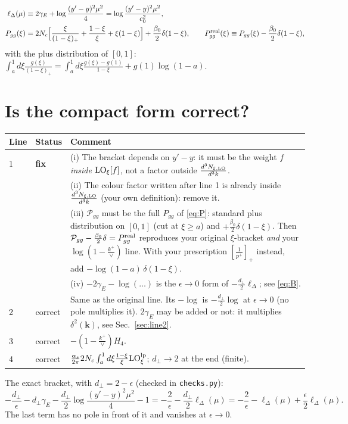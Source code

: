 \documentclass[10pt]{article}
\numberwithin{equation}{section}
\newcommand{\LO}{{\rm LO}}
\begin{document}
\begin{align}
\ell_\Delta(\mu)&\equiv2\gamma_E+\log\frac{(y'-y)^2\mu^2}{4}=\log\frac{(y'-y)^2\mu^2}{c_0^2},\label{eq:ell}\\
P_{gg}(\xi)&=2N_c\Big[\frac{\xi}{(1-\xi)_+}+\frac{1-\xi}{\xi}+\xi(1-\xi)\Big]+\frac{\beta_0}{2}\delta(1-\xi),\qquad
P^{\rm real}_{gg}(\xi)\equiv P_{gg}(\xi)-\frac{\beta_0}{2}\delta(1-\xi),\label{eq:P}
\end{align}
with the plus distribution of $[0,1]$: $\int_a^1d\xi\frac{g(\xi)}{(1-\xi)_+}=\int_a^1d\xi\frac{g(\xi)-g(1)}{1-\xi}+g(1)\log(1-a)$.

\section{Is the compact form correct?}
\begin{center}\small
\begin{tabular}{@{}l l p{}@{}}
\toprule
Line & Status & Comment\\\midrule
1 & \textbf{fix} & (i) The bracket depends on $y'-y$: it must be the weight $f$ \emph{inside} $\LO_\xi[f]$, not a factor outside $\frac{d^3N_{\xi,\rm LO}}{d^3k}$.\\
  & & (ii) The colour factor written after line 1 is already inside $\frac{d^3N_{\xi,\rm LO}}{d^3k}$ (your own definition): remove it.\\
  & & (iii) $\mathcal P_{gg}$ must be the full $P_{gg}$ of \eqref{eq:P}: standard plus distribution on $[0,1]$ (cut at $\xi\ge a$) and $+\frac{\beta_0}{2}\delta(1-\xi)$. Then $\mathcal P_{gg}-\frac{\beta_0}{2}\delta=P^{\rm real}_{gg}$ reproduces your original $\xi$-bracket \emph{and} your $\log(1-\frac{k^+}{\vee})$ line. With your prescription $[\frac1{p^+}]_+$ instead, add $-\log(1-a)\,\delta(1-\xi)$.\\
  & & (iv) $-2\gamma_E-\log(\dots)$ is the $\epsilon\to0$ form of $-\frac{d_\perp}{2}\ell_\Delta$; see \eqref{eq:B}.\\
2 & correct & Same as the original line. Its $-\log$ is $-\frac{d_\perp}{2}\log$ at $\epsilon\to0$ (no pole multiplies it). $2\gamma_E$ may be added or not: it multiplies $\delta^2(\mathbf k)$, see Sec.~\ref{sec:line2}.\\
3 & correct & $-(1-\frac{k^+}{\vee})H_4$.\\
4 & correct & $\frac{\alpha_s}{2\pi}2N_c\int_a^1d\xi\frac{1-\xi}{\xi}\LO^{\rm lp}_\xi$; $d_\perp\to2$ at the end (finite).\\
\bottomrule
\end{tabular}
\end{center}
The exact bracket, with $d_\perp=2-\epsilon$ (checked in \texttt{checks.py}):
\begin{equation}
-\frac{d_\perp}{\epsilon}-d_\perp\gamma_E-\frac{d_\perp}{2}\log\frac{(y'-y)^2\mu^2}{4}-1=-\frac2\epsilon-\frac{d_\perp}{2}\ell_\Delta(\mu)=-\frac2\epsilon-\ell_\Delta(\mu)+\frac\epsilon2\ell_\Delta(\mu).\label{eq:B}
\end{equation}
The last term has no pole in front of it and vanishes at $\epsilon\to0$.
\end{document}
